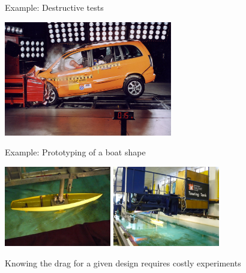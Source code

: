\documentclass{beamer}
\begin{document}
\begin{frame}{}
\begin{exampleblock}{Example: Destructive tests}
\begin{center}
\includegraphics[height=5cm]{figures/crash-test}
\end{center}
\end{exampleblock}
\end{frame}

\begin{frame}{}
\begin{exampleblock}{Example: Prototyping of a boat shape}
\begin{center}
\includegraphics[height=3.5cm]{figures/carene} \qquad \includegraphics[height=3.5cm]{figures/carene2}
\end{center}
Knowing the drag for a given design requires costly experiments
\end{exampleblock}
\end{frame}
\end{document}
